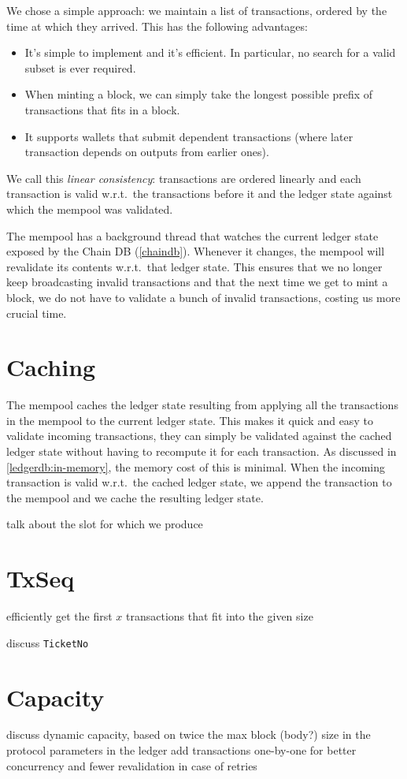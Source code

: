 We chose a simple approach: we maintain a list of transactions, ordered by the
time at which they arrived. This has the following advantages:

\begin{itemize}
\item It's simple to implement and it's efficient. In particular, no search for
  a valid subset is ever required.
\item When minting a block, we can simply
  take the longest possible prefix of transactions that fits in a block.
\item It supports wallets that submit dependent transactions (where later
  transaction depends on outputs from earlier ones).
\end{itemize}

We call this \emph{linear consistency}: transactions are ordered linearly and
each transaction is valid w.r.t.\ the transactions before it and the ledger
state against which the mempool was validated.

The mempool has a background thread that watches the current ledger state
exposed by the Chain DB (\cref{chaindb}). Whenever it changes, the mempool will
revalidate its contents w.r.t.\ that ledger state. This ensures that we no
longer keep broadcasting invalid transactions and that the next time we get to
mint a block, we do not have to validate a bunch of invalid transactions,
costing us more crucial time.

\section{Caching}

The mempool caches the ledger state resulting from applying all the transactions
in the mempool to the current ledger state. This makes it quick and easy to
validate incoming transactions, they can simply be validated against the cached
ledger state without having to recompute it for each transaction. As discussed
in \cref{ledgerdb:in-memory}, the memory cost of this is minimal. When the
incoming transaction is valid w.r.t.\ the cached ledger state, we append the
transaction to the mempool and we cache the resulting ledger state.

 talk about the slot for which we produce

\section{TxSeq}

 efficiently get the first $x$ transactions that fit into the given size

 discuss \lstinline!TicketNo!

\section{Capacity}

 discuss dynamic capacity, based on twice the max block (body?) size in the protocol parameters in the ledger
 add transactions one-by-one for better concurrency and fewer revalidation in case of retries
